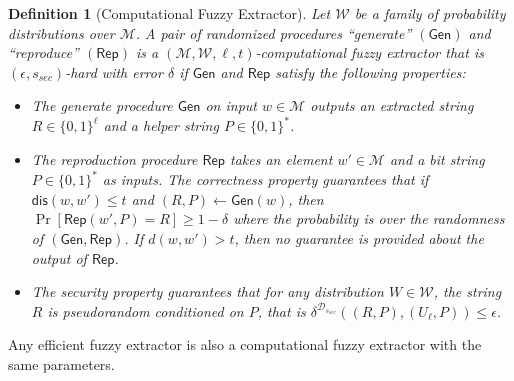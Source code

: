 \documentclass[11pt]{article}
\newcommand{\secref}[1]{\mbox{Section~\ref{#1}}}
\newcommand{\class}[1]{{\ensuremath{\mathsf{#1}}}}
\newcommand{\gen}{\ensuremath{\class{Gen}}\xspace}
\newcommand{\rep}{\ensuremath{\class{Rep}}\xspace}
\newcommand{\rec}{\ensuremath{\class{Rec}}\xspace}
\newcommand{\dis}{\ensuremath{\mathsf{dis}}}
\newtheorem{definition}[theorem]{Definition}
\newcommand{\authnote}[2]{{\textcolor{red}{\textsf{#1 notes: }\textcolor{blue}{ #2}}\marginpar{\textcolor{red}{\textbf{!!!!!}}}}}
\newcommand{\authnote}[2]{}
\newcommand{\bnote}[1]{{\authnote{Ben}{#1}}}
\begin{document}
\begin{definition}[Computational Fuzzy Extractor]\label{def:comp fuzzy extractor}
Let $\mathcal{W}$ be a family of probability distributions over $\mathcal{M}$. A pair of randomized procedures ``generate'' $(\gen)$ and ``reproduce'' $(\rep)$ is a $(\mathcal{M}, \mathcal{W}, \ell, t)$-\emph{computational fuzzy extractor} that is $(\epsilon, s_{sec})$-hard with error $\delta$ if \gen and \rep satisfy the following properties:
\begin{itemize}
\item The generate procedure \gen on input $w\in \mathcal{M}$ outputs an extracted string $R\in\{0,1\}^\ell$ and a helper string $P\in\{0,1\}^*$.
\item The reproduction procedure \rep takes an element $w'\in\mathcal{M}$ and a bit string $P\in\{0,1\}^*$ as inputs.  The \emph{correctness} property guarantees that if $\dis(w, w')\leq t$ and $(R, P)\leftarrow \gen(w)$, then $\Pr[\rep( w', P) = R] \geq 1-\delta$ where the probability is over the randomness of $(\gen, \rep)$.  %
If $d(w, w') > t$, then no guarantee is provided about the output of \rep.
\item The \emph{security} property guarantees that for any distribution $W\in \mathcal{W}$, the string $R$ is pseudorandom conditioned on $P$, that is $\delta^{\mathcal{D}_{s_{sec}}}((R, P), (U_\ell, P))\leq \epsilon$.
\end{itemize}
\end{definition}
Any efficient fuzzy extractor is also a computational fuzzy extractor with the same parameters.%


\end{document}

